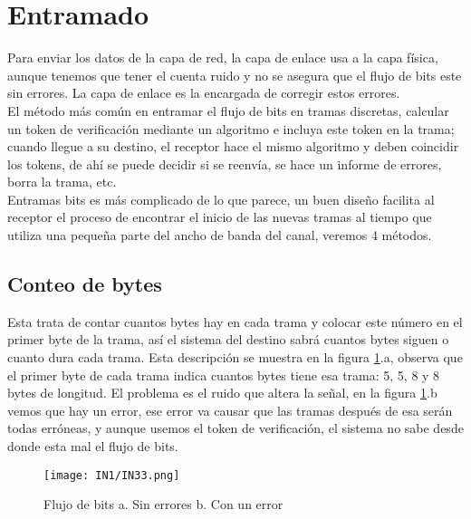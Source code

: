 \documentclass[
	12pt, %
	fleqn, %
	a4paper, %
]{LegrandOrangeBook}
\begin{document}
\section{Entramado}
Para enviar los datos de la capa de red, la capa de enlace usa a la capa física, aunque tenemos que tener el cuenta ruido y no se asegura que el flujo de bits este sin errores. La capa de enlace es la encargada de corregir estos errores.\\
El método más común en entramar el flujo de bits en tramas discretas, calcular un token de verificación mediante un algoritmo e incluya este token en la trama; cuando llegue a su destino, el receptor hace el mismo algoritmo y deben coincidir los tokens, de ahí se puede decidir si se reenvía, se hace un informe de errores, borra la trama, etc.\\
Entramas bits es más complicado de lo que parece, un buen diseño facilita al receptor el proceso de encontrar el inicio de las nuevas tramas al tiempo que utiliza una pequeña parte del ancho de banda del canal, veremos 4 métodos. 
\subsection{Conteo de bytes}
Esta trata de contar cuantos bytes hay en cada trama y colocar este número en el primer byte de la trama, así el sistema del destino sabrá cuantos bytes siguen o cuanto dura cada trama. Esta descripción se muestra en la figura \ref{fig: conteo de bytes}.a, observa que el primer byte de cada trama indica cuantos bytes tiene esa trama: 5, 5, 8 y 8 bytes de longitud. El problema es el ruido que altera la señal, en la figura \ref{fig: conteo de bytes}.b vemos que hay un error, ese error va causar que las tramas después de esa serán todas erróneas, y aunque usemos el token de verificación, el sistema no sabe desde donde esta mal el flujo de bits.
\begin{figure}[H]
\centering
\texttt{[image: IN1/IN33.png]}
\caption{Flujo de bits a. Sin errores b. Con un error}
\label{fig: conteo de bytes}
\end{figure}
\end{document}
